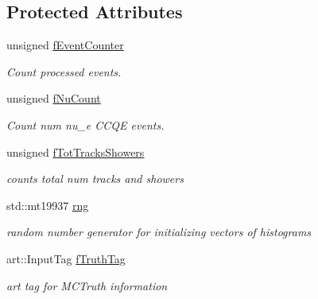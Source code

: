 \subsection*{Protected Attributes}
\begin{DoxyCompactItemize}
\item 
\hypertarget{classana_1_1SBNOsc_1_1NueSelection_afabc5bb1bf5a7a99313f4e12c335e99c}{
unsigned \hyperlink{classana_1_1SBNOsc_1_1NueSelection_afabc5bb1bf5a7a99313f4e12c335e99c}{fEventCounter}}
\label{classana_1_1SBNOsc_1_1NueSelection_afabc5bb1bf5a7a99313f4e12c335e99c}

\begin{DoxyCompactList}\small\item\em Count processed events. \item\end{DoxyCompactList}\item 
\hypertarget{classana_1_1SBNOsc_1_1NueSelection_aead1cb7ecd90992089e49372489c14f7}{
unsigned \hyperlink{classana_1_1SBNOsc_1_1NueSelection_aead1cb7ecd90992089e49372489c14f7}{fNuCount}}
\label{classana_1_1SBNOsc_1_1NueSelection_aead1cb7ecd90992089e49372489c14f7}

\begin{DoxyCompactList}\small\item\em Count num nu\_\-e CCQE events. \item\end{DoxyCompactList}\item 
\hypertarget{classana_1_1SBNOsc_1_1NueSelection_a98a1f8087e28e020f8f5a85656fa4e01}{
unsigned \hyperlink{classana_1_1SBNOsc_1_1NueSelection_a98a1f8087e28e020f8f5a85656fa4e01}{fTotTracksShowers}}
\label{classana_1_1SBNOsc_1_1NueSelection_a98a1f8087e28e020f8f5a85656fa4e01}

\begin{DoxyCompactList}\small\item\em counts total num tracks and showers \item\end{DoxyCompactList}\item 
\hypertarget{classana_1_1SBNOsc_1_1NueSelection_aee198d69333054b12b7cb42425ca4a1e}{
std::mt19937 \hyperlink{classana_1_1SBNOsc_1_1NueSelection_aee198d69333054b12b7cb42425ca4a1e}{rng}}
\label{classana_1_1SBNOsc_1_1NueSelection_aee198d69333054b12b7cb42425ca4a1e}

\begin{DoxyCompactList}\small\item\em random number generator for initializing vectors of histograms \item\end{DoxyCompactList}\item 
art::InputTag \hyperlink{classana_1_1SBNOsc_1_1NueSelection_ae339e3e05a25bb103543328f4d6c62ae}{fTruthTag}
\begin{DoxyCompactList}\small\item\em art tag for MCTruth information \item\end{DoxyCompactList}\end{DoxyCompactItemize}


